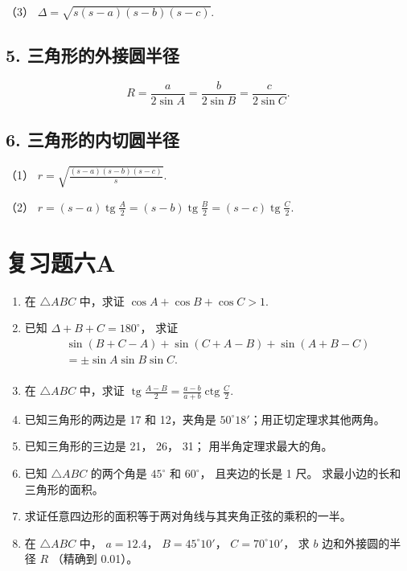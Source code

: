 （3） \(\Delta = \sqrt{s(s - a)(s - b)(s - c)}\).

\subsection{5. 三角形的外接圆半径}

\[
R = \frac {a}{2 \sin A} = \frac {b}{2 \sin B} = \frac {c}{2 \sin C}.
\]

\subsection{6. 三角形的内切圆半径}

（1） \(r = \sqrt{\frac{(s - a)(s - b)(s - c)}{s}}.\)

（2）
\(r = (s - a) \operatorname{tg} \frac{A}{2} = (s - b) \operatorname{tg} \frac{B}{2} = (s - c) \operatorname{tg} \frac{C}{2}.\)

\section{复习题六A}

\begin{enumerate}
\item
  在 \(\triangle ABC\) 中，求证 \(\cos A + \cos B + \cos C > 1\).
\item
  已知 \(\Delta + B + C = 180^{\circ}\)， 求证
\[
\begin{array}{l} \sin (B + C - A) + \sin (C + A - B) + \sin (A + B - C) \\ = \pm \sin A \sin B \sin C. \\ \end{array}
\]
\item
  在 \(\triangle ABC\) 中，求证
  \(\operatorname{tg} \frac{A - B}{2} = \frac{a - b}{a + b} \operatorname{ctg} \frac{C}{2}\).
\item
  已知三角形的两边是 17 和 12，夹角是
  \(50^{\circ}18'\)；用正切定理求其他两角。
\item
  已知三角形的三边是 21， 26， 31； 用半角定理求最大的角。
\item
  已知 \(\triangle ABC\) 的两个角是 \(45^{\circ}\) 和 \(60^{\circ}\)，
  且夹边的长是 1 尺。 求最小边的长和三角形的面积。
\item
  求证任意四边形的面积等于两对角线与其夹角正弦的乘积的一半。
\item
  在 \(\triangle ABC\) 中， \(a = 12.4\)， \(B = 45^{\circ}10'\)，
  \(C = 70^{\circ}10'\)， 求 \(b\) 边和外接圆的半径 \(R\) （精确到
  0.01）。
\end{enumerate}

